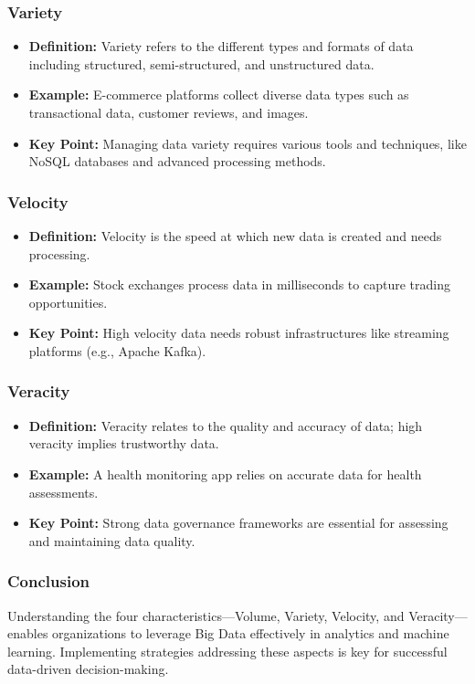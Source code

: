 \documentclass[aspectratio=169]{beamer}
\begin{document}
\begin{frame}[fragile]
    \frametitle{Variety}
    \begin{itemize}
        \item \textbf{Definition:} Variety refers to the different types and formats of data including structured, semi-structured, and unstructured data.
        \item \textbf{Example:} E-commerce platforms collect diverse data types such as transactional data, customer reviews, and images.
        \item \textbf{Key Point:} Managing data variety requires various tools and techniques, like NoSQL databases and advanced processing methods.
    \end{itemize}
\end{frame}

\begin{frame}[fragile]
    \frametitle{Velocity}
    \begin{itemize}
        \item \textbf{Definition:} Velocity is the speed at which new data is created and needs processing.
        \item \textbf{Example:} Stock exchanges process data in milliseconds to capture trading opportunities.
        \item \textbf{Key Point:} High velocity data needs robust infrastructures like streaming platforms (e.g., Apache Kafka).
    \end{itemize}
\end{frame}

\begin{frame}[fragile]
    \frametitle{Veracity}
    \begin{itemize}
        \item \textbf{Definition:} Veracity relates to the quality and accuracy of data; high veracity implies trustworthy data.
        \item \textbf{Example:} A health monitoring app relies on accurate data for health assessments.
        \item \textbf{Key Point:} Strong data governance frameworks are essential for assessing and maintaining data quality.
    \end{itemize}
\end{frame}

\begin{frame}[fragile]
    \frametitle{Conclusion}
    Understanding the four characteristics—Volume, Variety, Velocity, and Veracity—enables organizations to leverage Big Data effectively in analytics and machine learning. Implementing strategies addressing these aspects is key for successful data-driven decision-making.
\end{frame}
\end{document}
